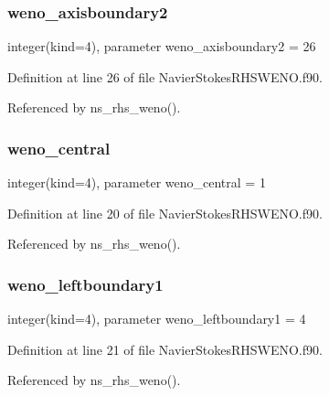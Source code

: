 \subsubsection{\texorpdfstring{weno\+\_\+axisboundary2}{weno\_axisboundary2}}
{\footnotesize\ttfamily integer(kind=4), parameter weno\+\_\+axisboundary2 = 26}



Definition at line 26 of file Navier\+Stokes\+R\+H\+S\+W\+E\+N\+O.\+f90.



Referenced by ns\+\_\+rhs\+\_\+weno().

\hypertarget{namespacenavierstokesrhsweno_af011f25d6b892365a71782a1acc53cac}{}\label{namespacenavierstokesrhsweno_af011f25d6b892365a71782a1acc53cac} 
\subsubsection{\texorpdfstring{weno\+\_\+central}{weno\_central}}
{\footnotesize\ttfamily integer(kind=4), parameter weno\+\_\+central = 1}



Definition at line 20 of file Navier\+Stokes\+R\+H\+S\+W\+E\+N\+O.\+f90.



Referenced by ns\+\_\+rhs\+\_\+weno().

\hypertarget{namespacenavierstokesrhsweno_aaea0ea1a649fc6e1c76d7e09afd83e17}{}\label{namespacenavierstokesrhsweno_aaea0ea1a649fc6e1c76d7e09afd83e17} 
\subsubsection{\texorpdfstring{weno\+\_\+leftboundary1}{weno\_leftboundary1}}
{\footnotesize\ttfamily integer(kind=4), parameter weno\+\_\+leftboundary1 = 4}



Definition at line 21 of file Navier\+Stokes\+R\+H\+S\+W\+E\+N\+O.\+f90.



Referenced by ns\+\_\+rhs\+\_\+weno().

\hypertarget{namespacenavierstokesrhsweno_abc7c2a47f826df42ffb4de7f3c3b9e0b}{}\label{namespacenavierstokesrhsweno_abc7c2a47f826df42ffb4de7f3c3b9e0b} 
